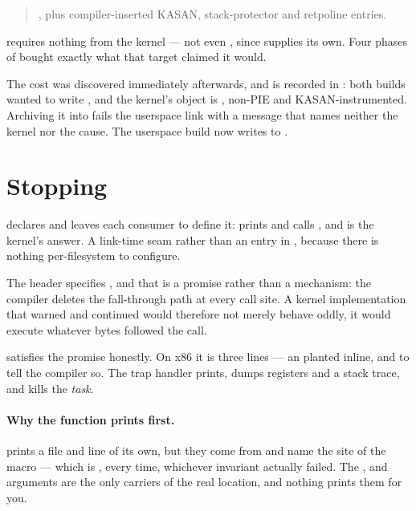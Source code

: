 \begin{quote}
, plus compiler-inserted KASAN, stack-protector and retpoline
entries.
\end{quote}

 requires nothing from the kernel --- not even ,
since  supplies its own. Four phases of
 bought exactly what that target claimed it would.

The cost was discovered immediately afterwards, and is recorded in
: both builds wanted to write , and the
kernel's object is , non-PIE and KASAN-instrumented.
Archiving it into  fails the userspace link with a message
that names neither the kernel nor the cause. The userspace build now writes to
.

\section{Stopping}

 declares  and leaves
each consumer to define it:  prints and calls
, and  is the kernel's answer. A link-time
seam rather than an entry in , because there is nothing
per-filesystem to configure.

The header specifies , and that is a promise rather than a
mechanism: the compiler deletes the fall-through path at every call site. A
kernel implementation that warned and continued would therefore not merely
behave oddly, it would execute whatever bytes followed the call.

 satisfies the promise honestly. On x86 it is three lines --- an
 planted inline, and  to tell the
compiler so. The trap handler prints, dumps registers and a stack trace, and
kills the \emph{task}.

\paragraph{Why the function prints first.} 
prints a file and line of its own, but they come from  and
name the site of the  macro --- which is ,
every time, whichever invariant actually failed. The ,
 and  arguments are the only carriers of the real
location, and nothing prints them for you.

